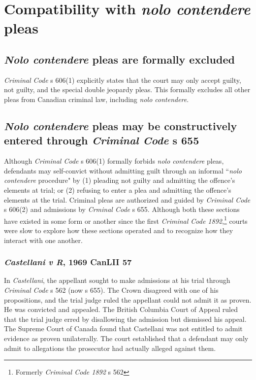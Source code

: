 \section{Compatibility with \textit{nolo contendere} pleas}

\subsection{\textit{Nolo contendere} pleas are formally excluded}

\textit{Criminal Code} s 606(1) explicitly states that the court may only accept guilty, not guilty, and the special double jeopardy pleas. This formally excludes all other pleas from Canadian criminal law, including \textit{nolo contendere}. 

\subsection{\textit{Nolo contendere} pleas may be constructively entered through \textit{Criminal Code} s 655}

Although \textit{Criminal Code} s 606(1) formally forbids \textit{nolo contendere} pleas, defendants may self-convict without admitting guilt through an informal ``\textit{nolo contendere} procedure" by (1) pleading not guilty and admitting the offence's elements at trial; or (2) refusing to enter a plea and admitting the offence's elements at the trial. Criminal pleas are authorized and guided by \textit{Criminal Code} s 606(2) and admissions by \textit{Crminal Code} s 655. Although both these sections have existed in some form or another since the first \textit{Criminal Code 1892},\footnote{Formerly \textit{Criminal Code 1892} s 562} courts were slow to explore how these sections operated and to recognize how they interact with one another.

\subsubsection{\textit{Castellani v R}, 1969 CanLII 57}

In \textit{Castellani}, the appellant sought to make admissions at his trial through \textit{Criminal Code} s 562 (now s 655). The Crown disagreed with one of his propositions, and the trial judge ruled the appellant could not admit it as proven. He was convicted and appealed. The British Columbia Court of Appeal ruled that the trial judge erred by disallowing the admission but dismissed his appeal. The Supreme Court of Canada found that Castellani was not entitled to admit evidence as proven unilaterally. The court established that a defendant may only admit to allegations the prosecutor had actually alleged against them.

